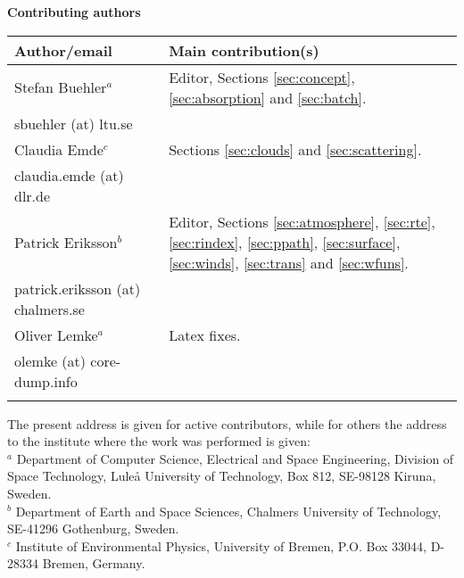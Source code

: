 \documentclass[11pt,twoside,a4paper,fleqn]{book}
\begin{document}
%
\newpage
\thispagestyle{plain}
%
\begin{center}
  {\Large \bf Contributing authors}
\end{center}
\vspace*{10mm}
\begin{tabular}{lp{10mm}l}
  \hline
  {\bf Author/email} & & {\bf Main contribution(s)} \\
  \hline
  Stefan Buehler$^a$ & & Editor, Sections \ref{sec:concept},
  \ref{sec:absorption} and \ref{sec:batch}.\\
  sbuehler (at) ltu.se & &        \\
 \hline
  Claudia Emde$^c$ & & Sections \ref{sec:clouds} and \ref{sec:scattering}.\\
  claudia.emde (at) dlr.de & & \\
  \hline
  Patrick Eriksson$^b$ &  & Editor, 
  Sections \ref{sec:atmosphere}, \ref{sec:rte}, 
  \ref{sec:rindex}, \ref{sec:ppath}, \ref{sec:surface}, 
  \ref{sec:winds}, \ref{sec:trans} and \ref{sec:wfuns}.\\  
  patrick.eriksson (at) chalmers.se & & \\
  \hline
  Oliver Lemke$^a$ & & Latex fixes.\\
  olemke (at) core-dump.info & & \\
  \hline
 &&\\
\end{tabular}


\noindent
The present address is given for active contributors, while for others
the address to the institute where the work was performed is given:\\
$^a$ Department of Computer Science, Electrical and Space Engineering,
Division of Space Technology, Lule{\aa} University of Technology, Box
812, SE-98128 Kiruna, Sweden. \\
$^b$ Department of Earth and Space Sciences, Chalmers University of Technology,
SE-41296 Gothenburg, Sweden. \\
$^c$ Institute of Environmental Physics, University of Bremen, P.O. Box 33044, 
D-28334 Bremen, Germany. \\
\end{document}
